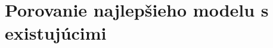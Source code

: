 \section{Porovanie najlepšieho modelu s existujúcimi}

\iffalse
cnn:

final correlation coeficient: 0.3891757367163311
final SIM: 0.30586936122666497
final NSS: 1.2774279939809017
final judd AUC: 0.8380535277085104
final shuffled AUC: 0.8247464580221275
final borji AUC: 0.8247464580221275

autoencoder:

final correlation coeficient: 0.46347693013377667
final SIM: 0.39894061994859475
final NSS: 1.1588045041398367
final judd AUC: 0.7967435191207479
final shuffled AUC: 0.7245778882530994
final borji AUC: 0.7245778882530994


\fi
